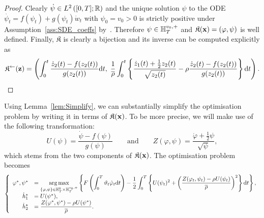 \begin{proof}
Clearly $\dot{\psi}\in L^{2}\left([0, T]; \mathbb{R}\right)$ and the unique solution $\psi$ to the ODE $\dot{\psi_t}=f(\psi_t)+g(\psi_t)\dot{w}_t$ with $\psi_0 = v_0 > 0$ is strictly positive under Assumption~\ref{ass:SDE_coeffs} by~\cite[Proposition 3.11]{Baldi2011GeneralDiffusions}. Therefore $\psi\in\mathbb{H}_T^{v_0, +}$ and $\mathfrak{K}(\boldsymbol{\mathrm{x}})=(\varphi, \psi)$ is well defined.
Finally, $\mathfrak{K}$ is clearly a bijection and its inverse can be computed explicitly as
\[
\mathfrak{K}^{\leftarrow}(\boldsymbol{\mathrm{z}}) = \left(\int_0^t \frac{\dot{z}_2(t)-f(z_2(t))}{g(z_2(t))}\mathrm{d} t,\; \frac1{\overline{\rho}}\int_0^t\left\{ \frac{\dot{z}_1(t) + \frac{1}{2}z_2(t)}{\sqrt{z_2(t)}} - \rho\frac{\dot{z}_2(t)-f(z_2(t))}{g(z_2(t))} \right\} \mathrm{d} t\right).
\]
\end{proof}
Using Lemma~\ref{lem:Simplify}, we can substantially simplify the optimisation problem by writing it in terms of $\mathfrak{K}(\boldsymbol{\mathrm{x}})$. To be more precise, we will make use of the following transformation:
\begin{equation}\label{eq:transformation_UZ}
U(\psi) = \frac{\dot{\psi} - f(\psi)}{g(\psi)}
\qquad\text{and}\qquad
Z(\varphi,\psi) = \frac{\dot{\varphi} + \frac{1}{2}\psi}{\sqrt{\psi}},
\end{equation}
which stems from the two components of $\mathfrak{K}(\boldsymbol{\mathrm{x}})$. The optimisation problem becomes
\begin{equation*}
\left\{
\begin{array}{rl}
\varphi^{*},\psi^{*} & = \displaystyle\operatorname*{arg\,max}\limits_{\{\varphi,\psi\} \in \mathbb{H}_T^0\times \mathbb{H}_T^{v_0,+}} \left\{F\left(\int_0^T\vartheta_t \dot{\varphi}_t \mathrm{d} t\right) - \frac{1}{2}\int_0^T \left\{U(\psi_t)^2 + \left(\frac{Z(\varphi_t,\psi_t) - \rho U(\psi_t)}{\overline{\rho}}\right)^2\right\}\mathrm{d} t\right\},\\
\dot{h}_1^{*} & = U(\psi^{*}), \\
\dot{h}_2^{*} & = \displaystyle \frac{Z(\varphi^{*},\psi^{*}) - \rho U(\psi^{*})}{\overline{\rho}}.
\end{array}
\right.
\end{equation*}
